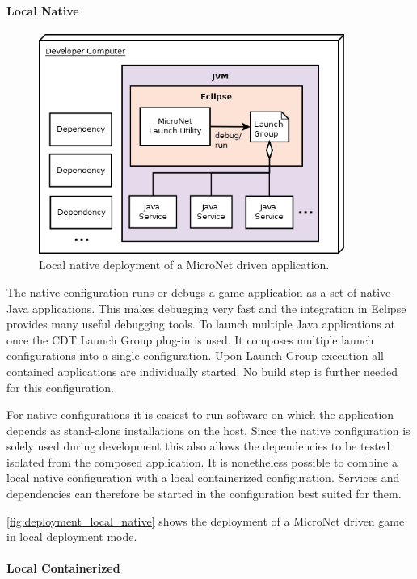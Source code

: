 
\paragraph{Local Native}

\begin{figure}
	\centering
	\includegraphics[width=10cm]{images/architecture/DeploymentLocalNative}
	\caption{Local native deployment of a MicroNet driven application.}
	\label{fig:deployment_local_native}
\end{figure}

The native configuration runs or debugs a game application as a set of native
Java applications. This makes debugging very fast and the integration in Eclipse
provides many useful debugging tools. To launch multiple Java applications at
once the CDT Launch Group plug-in is used. It composes multiple launch
configurations into a single configuration. Upon Launch Group execution all
contained applications are individually started. No build step is further needed
for this configuration.

For native configurations it is easiest to run software on which the application
depends as stand-alone installations on the host. Since the native configuration
is solely used during development this also allows the dependencies to be tested
isolated from the composed application. It is nonetheless possible to combine a
local native configuration with a local containerized configuration. Services
and dependencies can therefore be started in the configuration best suited for
them.

\autoref{fig:deployment_local_native} shows the deployment of a MicroNet
driven game in local deployment mode.

\paragraph{Local Containerized}

